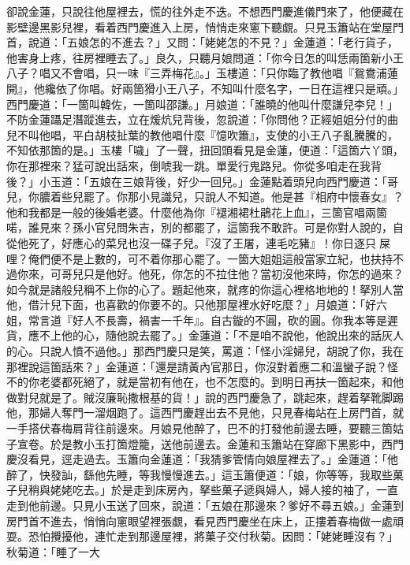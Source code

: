 卻說金蓮，只說往他屋裡去，慌的往外走不迭。不想西門慶進儀門來了，他便藏在影壁邊黑影兒裡，看着西門慶進入上房，悄悄走來窻下聽覷。{}只見玉簫站在堂屋門首，說道：「五娘怎的不進去？」又問：「姥姥怎的不見？」金蓮道：「老行貨子，他害身上疼，往房裡睡去了。」良久，只聽月娘問道：「你今日怎的叫恁兩箇新小王八子？唱又不會唱，只一味『三弄梅花』。」玉樓道：「只你臨了教他唱『鴛鴦浦蓮開』，他纔依了你唱。好兩箇猾小王八子，不知叫什麼名字，一日在這裡只是頑。」西門慶道：「一箇叫韓佐，一箇叫邵謙。」月娘道：「誰曉的他叫什麼謙兒李兒！」不防金蓮躡足潛蹤進去，立在煖炕兒背後，忽說道：「你問他？正經姐姐分付的曲兒不叫他唱，平白胡枝扯葉的教他唱什麼『憶吹簫』，支使的小王八子亂騰騰的，不知依那箇的是。」玉樓「噦」了一聲，扭回頭看見是金蓮，便道：「這箇六丫頭，你在那裡來？猛可說出話來，倒唬我一跳。{}單愛行鬼路兒。你從多咱走在我背後？」小玉道：「五娘在三娘背後，好少一回兒。」金蓮點着頭兒向西門慶道：「哥兒，你膿着些兒罷了。你那小見識兒，只說人不知道。他是甚『相府中懷春女』？他和我都是一般的後婚老婆。{}什麼他為你『褪湘裙杜鵑花上血』，三箇官唱兩箇喏，誰見來？孫小官兒問朱吉，別的都罷了，這箇我不敢許。可是你對人說的，自從他死了，好應心的菜兒也沒一碟子兒。『沒了王屠，連毛吃豬』！你日逐只𠳹屎哩？俺們便不是上數的，可不着你那心罷了。一箇大姐姐這般當家立紀，也扶持不過你來，{}可哥兒只是他好。他死，你怎的不拉住他？當初沒他來時，你怎的過來？如今就是諸般兒稱不上你的心了。題起他來，就疼的你這心裡格地地的！拏別人當他，借汁兒下面，{}也喜歡的你要不的。只他那屋裡水好吃麼？」月娘道：「好六姐，常言道『好人不長壽，禍害一千年』。{}自古鏇的不圓，砍的圓。你我本等是遲貨，應不上他的心，隨他說去罷了。」金蓮道：「不是咱不說他，他說出來的話灰人的心。只說人憤不過他。」那西門慶只是笑，罵道：「怪小淫婦兒，胡說了你，我在那裡說這箇話來？」金蓮道：「還是請黃內官那日，{}你沒對着應二和溫蠻子說？{}怪不的你老婆都死絕了，就是當初有他在，也不怎麼的。到明日再扶一箇起來，和他做對兒就是了。{}賊沒廉恥撒根基的貨！」說的西門慶急了，跳起來，趕着拏靴脚踢他，那婦人奪門一溜烟跑了。{}這西門慶趕出去不見他，只見春梅站在上房門首，就一手搭伏春梅肩背往前邊來。{}月娘見他醉了，巴不的打發他前邊去睡，要聽三箇姑子宣卷。於是教小玉打箇燈籠，送他前邊去。金蓮和玉簫站在穿廊下黑影中，西門慶沒看見，逕走過去。玉簫向金蓮道：「我猜爹管情向娘屋裡去了。」金蓮道：「他醉了，快發訕，{}繇他先睡，等我慢慢進去。」{}這玉簫便道：「娘，你等等，我取些菓子兒稍與姥姥吃去。」{}於是走到床房內，拏些菓子遞與婦人，婦人接的袖了，一直走到他前邊。只見小玉送了回來，說道：「五娘在那邊來？爹好不尋五娘。」金蓮到房門首不進去，悄悄向窻眼望裡張覷，看見西門慶坐在床上，正摟着春梅做一處頑耍。恐怕攪擾他，連忙走到那邊屋裡，將菓子交付秋菊。因問：「姥姥睡沒有？」秋菊道：「睡了一大